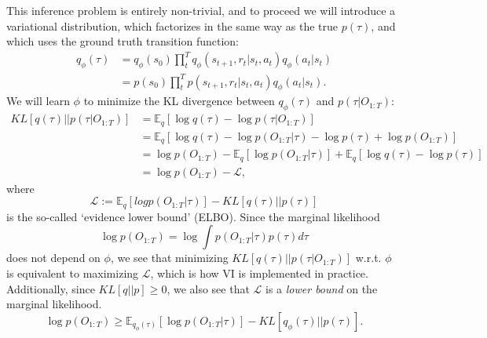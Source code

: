 This inference problem is entirely non-trivial, and to proceed we will introduce a variational distribution, which factorizes in the same way as the true $p(\tau)$, and which uses the ground truth transition function:
\begin{align}
    q_\phi(\tau) & = q_\phi(s_0) \prod_t^T q_\phi(s_{t+1}, r_t | s_t, a_t) q_\phi(a_t | s_t) \\
                 & = p(s_0) \prod_t^T p(s_{t+1}, r_t | s_t, a_t) q_\phi(a_t | s_t).
\end{align}
We will learn $\phi$ to minimize the KL divergence between $q_\phi(\tau)$ and $p(\tau | O_{1:T})$:
\begin{align}
    KL[q(\tau) || p(\tau | O_{1:T})] & = \mathbb{E}_q \left [ \log q(\tau) - \log p(\tau | O_{1:T}) \right ]                                                                \\
                                     & = \mathbb{E}_q \left [ \log q(\tau) - \log p(O_{1:T} | \tau) - \log p(\tau) + \log p(O_{1:T})  \right ]                              \\
                                     & = \log p(O_{1:T}) - \mathbb{E}_q \left [\log p(O_{1:T} | \tau) \right ] + \mathbb{E}_q \left [ \log q(\tau)  - \log p(\tau) \right ] \\
                                     & = \log p(O_{1:T}) - \mathcal{L},
\end{align}
where
\begin{equation}
    \mathcal{L} := \mathbb{E}_q \left [log p(O_{1:T} | \tau) \right ] - KL[q(\tau) || p(\tau)]
\end{equation}
is the so-called `evidence lower bound' (ELBO).
Since the marginal likelihood
\begin{equation}
    \log p(O_{1:T}) = \log \int p(O_{1:T} | \tau) p(\tau) d\tau
\end{equation}
does not depend on $\phi$, we see that minimizing $KL[q(\tau) || p(\tau | O_{1:T})]$ w.r.t. $\phi$ is equivalent to maximizing $\mathcal{L}$, which is how VI is implemented in practice.
Additionally, since $KL[q||p] \geq 0$, we also see that $\mathcal{L}$ is a \emph{lower bound} on the marginal likelihood.
\begin{equation}
    \log p(O_{1:T}) \geq  \mathbb{E}_{q_\phi(\tau)}[\log p(O_{1:T} | \tau) ] - KL[q_\phi(\tau) || p(\tau)].
\end{equation}

